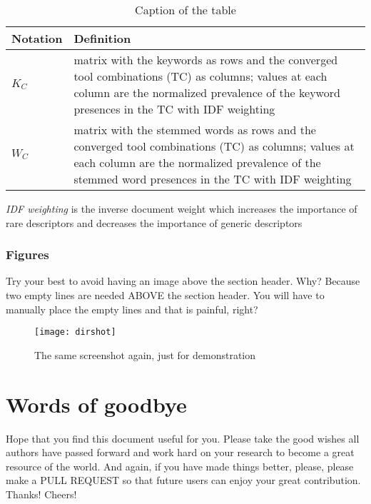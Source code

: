 \begin{table}[hp] %
\begin{threeparttable}
\caption{Caption of the table} 
\label{tab:table1}
\begin{tabular}{p{}p{}}
  \hline
    Notation & Definition\\ 
  \hline
    $K_C$ & matrix with the keywords as rows and the converged tool combinations (TC) as columns; values at each column are the normalized prevalence of the keyword presences in the TC with IDF weighting\\
    $W_C$ & matrix with the stemmed words as rows and the converged tool combinations (TC) as columns; values at each column are the normalized prevalence of the stemmed word presences in the TC with IDF weighting\\
   \hline
   \end{tabular}
   \begin{tablenotes}
        \small
        \item *\textit{IDF weighting} is the inverse document weight which increases the importance of rare descriptors and decreases the importance of generic descriptors
   \end{tablenotes}
\end{threeparttable}
\end{table}

\newpage %
\subsubsection{Figures}
\hspace{2cm}Try your best to avoid having an image above the section header. Why? Because two empty lines are needed ABOVE the section header. You will have to manually place the empty lines and that is painful, right?

\begin{figure}[!hpb] %
    \centering
    \texttt{[image: dirshot]}
    \caption{The same screenshot again, just for demonstration}
    \label{fig:shot2}
\end{figure}

\section{Words of goodbye}
Hope that you find this document useful for you. Please take the good wishes all authors have passed forward and work hard on your research to become a great resource of the world. And again, if you have made things better, please, please make a PULL REQUEST so that future users can enjoy your great contribution. Thanks! Cheers!
